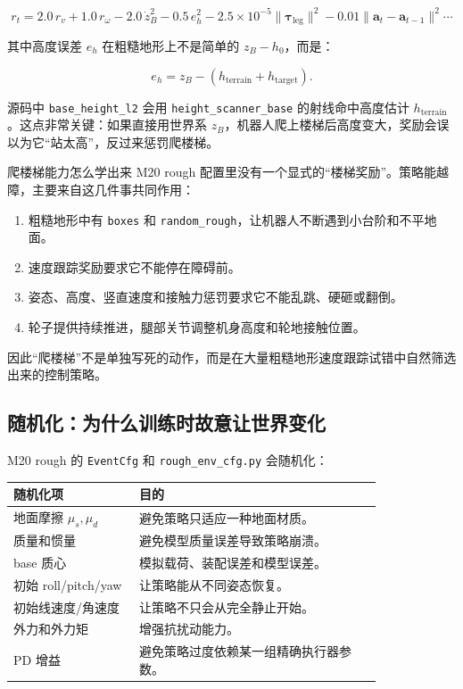 \documentclass[UTF8,11pt,a4paper]{ctexart}
\newcommand{\bs}[1]{\bm{#1}}
\begin{document}
\[
\boxed{
r_t
=
2.0\,r_v
+1.0\,r_\omega
-2.0\,\dot z_B^2
-0.5\,e_h^2
-2.5\times10^{-5}\|\bs\tau_{\mathrm{leg}}\|^2
-0.01\|\bs a_t-\bs a_{t-1}\|^2
\cdots
}
\]

其中高度误差 \(e_h\) 在粗糙地形上不是简单的 \(z_B-h_0\)，而是：

\[
\boxed{
e_h
=
z_B
-
\left(
h_{\mathrm{terrain}}+h_{\mathrm{target}}
\right).
}
\]

源码中 \texttt{base\_height\_l2} 会用 \texttt{height\_scanner\_base} 的射线命中高度估计
\(h_{\mathrm{terrain}}\)。这点非常关键：如果直接用世界系 \(z_B\)，机器人爬上楼梯后高度变大，奖励会误以为它“站太高”，反过来惩罚爬楼梯。

\begin{greenbox}{爬楼梯能力怎么学出来}
M20 rough 配置里没有一个显式的“楼梯奖励”。策略能越障，主要来自这几件事共同作用：
\begin{enumerate}
  \item 粗糙地形中有 \texttt{boxes} 和 \texttt{random\_rough}，让机器人不断遇到小台阶和不平地面。
  \item 速度跟踪奖励要求它不能停在障碍前。
  \item 姿态、高度、竖直速度和接触力惩罚要求它不能乱跳、硬砸或翻倒。
  \item 轮子提供持续推进，腿部关节调整机身高度和轮地接触位置。
\end{enumerate}
因此“爬楼梯”不是单独写死的动作，而是在大量粗糙地形速度跟踪试错中自然筛选出来的控制策略。
\end{greenbox}

\subsection{随机化：为什么训练时故意让世界变化}

M20 rough 的 \texttt{EventCfg} 和 \texttt{rough\_env\_cfg.py} 会随机化：

\begin{center}
\renewcommand{\arraystretch}{1.25}
\begin{tabular}{p{0.28\linewidth}p{0.54\linewidth}}
\toprule
\textbf{随机化项} & \textbf{目的}\\
\midrule
地面摩擦 \(\mu_s,\mu_d\) & 避免策略只适应一种地面材质。\\
质量和惯量 & 避免模型质量误差导致策略崩溃。\\
base 质心 & 模拟载荷、装配误差和模型误差。\\
初始 roll/pitch/yaw & 让策略能从不同姿态恢复。\\
初始线速度/角速度 & 让策略不只会从完全静止开始。\\
外力和外力矩 & 增强抗扰动能力。\\
PD 增益 & 避免策略过度依赖某一组精确执行器参数。\\
\bottomrule
\end{tabular}
\end{center}
\end{document}
